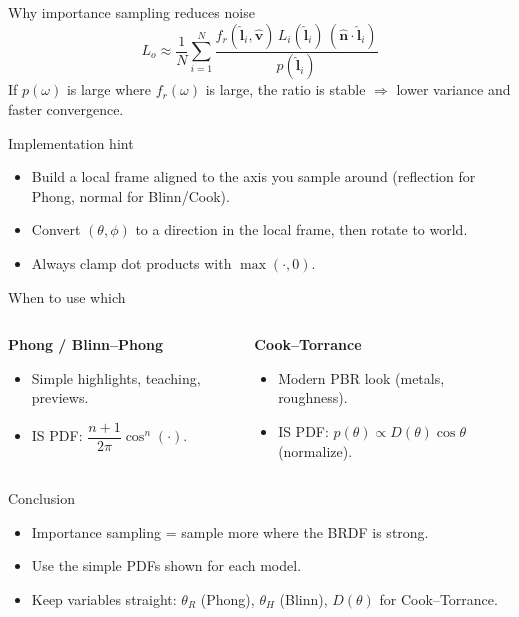 \documentclass[aspectratio=169]{beamer}
\newcommand{\nvec}{\hat{\mathbf{n}}}
\newcommand{\lvec}{\hat{\mathbf{l}}}
\newcommand{\vvec}{\hat{\mathbf{v}}}
\let\olditem\item
\renewcommand{\item}{\olditem \vspace{2pt}}
\begin{document}
\begin{frame}{Why importance sampling reduces noise}
\[
L_o \approx \frac{1}{N}\sum_{i=1}^N
\frac{f_r(\lvec_i,\vvec)\,L_i(\lvec_i)\,(\nvec\!\cdot\!\lvec_i)}{p(\lvec_i)}
\]
If $p(\omega)$ is large where $f_r(\omega)$ is large, the ratio is stable $\Rightarrow$ lower variance and faster convergence.
\end{frame}

\begin{frame}{Implementation hint}
\begin{itemize}
  \item Build a local frame aligned to the axis you sample around (reflection for Phong, normal for Blinn/Cook).
  \item Convert $(\theta,\phi)$ to a direction in the local frame, then rotate to world.
  \item Always clamp dot products with $\max(\cdot,0)$.
\end{itemize}
\end{frame}

\begin{frame}{When to use which}
\begin{columns}
\begin{column}{0.5\textwidth}
\textbf{Phong / Blinn–Phong}
\begin{itemize}
  \item Simple highlights, teaching, previews.
  \item IS PDF: $\dfrac{n+1}{2\pi}\cos^n(\cdot)$.
\end{itemize}
\end{column}
\begin{column}{0.5\textwidth}
\textbf{Cook–Torrance}
\begin{itemize}
  \item Modern PBR look (metals, roughness).
  \item IS PDF: $p(\theta)\propto D(\theta)\cos\theta$ (normalize).
\end{itemize}
\end{column}
\end{columns}
\end{frame}

\begin{frame}{Conclusion}
\begin{itemize}
  \item Importance sampling = sample more where the BRDF is strong.
  \item Use the simple PDFs shown for each model.
  \item Keep variables straight: $\theta_R$ (Phong), $\theta_H$ (Blinn), $D(\theta)$ for Cook–Torrance.
\end{itemize}
\end{frame}
\end{document}
